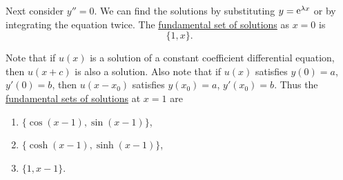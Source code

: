 {\begin{Solution}
  Next consider $y'' = 0$.  We can find the solutions by substituting
  $y = \mathop{\mathrm{e}}\nolimits^{\lambda x}$ or by integrating the equation twice.  The 
  \hyperref[section The Fundamental Set of Solutions]
    {fundamental set of solutions}
  as $x = 0$ is
  \[
  \{ 1, x \}.
  \]

  Note that if $u(x)$ is a solution of a constant coefficient differential 
  equation, then $u(x+c)$ is also a solution.  Also note that if $u(x)$ 
  satisfies $y(0) = a$, $y'(0) = b$, then $u(x-x_0)$ satisfies 
  $y(x_0) = a$, $y'(x_0) = b$.  Thus the 
  \hyperref[section The Fundamental Set of Solutions]
    {fundamental sets of solutions}
  at $x = 1$ are
  \begin{enumerate}
  \item $\{ \cos(x-1), \sin(x-1) \}$,
  \item $\{ \cosh(x-1), \sinh(x-1) \}$,
  \item $\{ 1, x-1 \}$.
  \end{enumerate}
\end{Solution}







}
